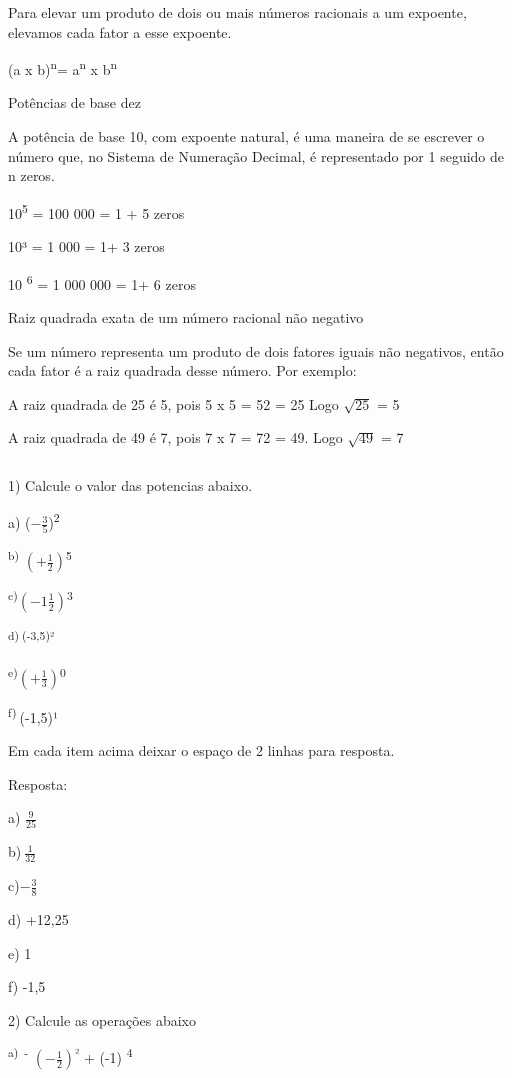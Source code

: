{Para elevar um produto de dois ou mais números racionais a um expoente,
elevamos cada fator a esse expoente.

(a x b)\textsuperscript{n}= a\textsuperscript{n} x b\textsuperscript{n}

Potências de base dez

A potência de base 10, com expoente natural, é uma maneira de se
escrever o número que, no Sistema de Numeração Decimal, é representado
por 1 seguido de n zeros.

10\textsuperscript{5} = 100 000 = 1 + 5 zeros

10³ = 1 000 = 1+ 3 zeros

10 \textsuperscript{6} = 1 000 000 = 1+ 6 zeros

Raiz quadrada exata de um número racional não negativo

Se um número representa um produto de dois fatores iguais não negativos,
então cada fator é a raiz quadrada desse número. Por exemplo:

A raiz quadrada de 25 é 5, pois 5 x 5 = 52 = 25 Logo \(\sqrt{25}\) = 5

A raiz quadrada de 49 é 7, pois 7 x 7 = 72 = 49. Logo \(\sqrt{49}\) = 7


\[\ \]

1) Calcule o valor das potencias abaixo.

a) (\(- \frac{3}{5}\))\textsuperscript{2}

\textsuperscript{b)} \(( + \frac{1}{2})\)\textsuperscript{5}

\textsuperscript{c)}\(( - 1\frac{1}{2})\)\textsuperscript{3}

\textsuperscript{d)}\(\ \)\textsuperscript{(-3,5)²}

\textsuperscript{e)}\(( + \frac{1}{3})\)\textsuperscript{0}

\textsuperscript{f)}\(\ \)(-1,5)¹

Em cada item acima deixar o espaço de 2 linhas para resposta.

Resposta:

a) \(\frac{9}{25}\)

b)\(\ \frac{1}{32}\)

c)\(- \frac{3}{8}\)

d) +12,25

e) 1

f) -1,5\(\ \)

2) Calcule as operações abaixo

\textsuperscript{a)~-} \(( - \frac{1}{2})\)\textsuperscript{²} + (-1)
\textsuperscript{4}

}
